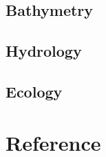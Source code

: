 \documentclass{article}
\begin{document}
\subsection{Bathymetry}


\subsection{Hydrology}


\subsection{Ecology}



\newpage
{}
\fancyfoot[C]{\thepage} 
\thispagestyle{fancy}
\section{Reference}
\end{document}
